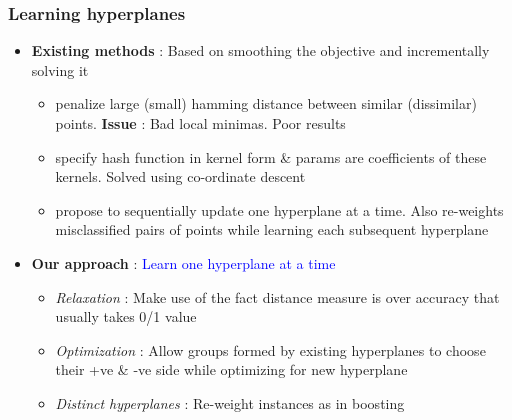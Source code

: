 \documentclass[usenames,dvipsnames, 11pt]{beamer}
\newlength{\wideitemsep}
\let\olditem\item
\renewcommand{\item}{\setlength{\itemsep}{\wideitemsep}\olditem}
\begin{document}
\begin{frame}
\frametitle{Learning hyperplanes}
\pause
\begin{itemize}
\item \textbf{Existing methods} : Based on smoothing the objective and incrementally solving it
\pause
\begin{itemize}
\item \citeauthor{norouzi2011minimal} penalize large (small) hamming distance between similar (dissimilar) points. \textbf{Issue} : Bad local minimas. Poor results
\pause
\item \citeauthor{kulis2009learning} specify hash function in kernel form \& params are coefficients of these kernels. Solved using co-ordinate descent
\pause
\item \citeauthor{wang2010sequential} propose to sequentially update one hyperplane at a time. Also re-weights misclassified pairs of points while learning each subsequent hyperplane
\end{itemize}
\pause
\item \textbf{Our approach} : \textcolor{Blue}{Learn one hyperplane at a time}
\pause
\begin{itemize}
\item \emph{Relaxation} : Make use of the fact distance measure is over accuracy that usually takes 0/1 value
\item \emph{Optimization} : Allow groups formed by existing hyperplanes to choose their +ve \& -ve side while optimizing for new hyperplane
\item \emph{Distinct hyperplanes} : Re-weight instances as in boosting
\end{itemize}
\end{itemize}
\end{frame}
\end{document}
